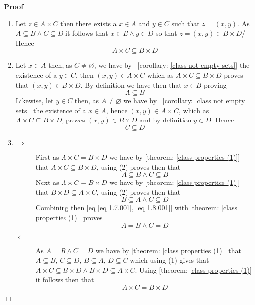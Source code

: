 \documentclass{book}
\newenvironment{proof}{\noindent\textbf{Proof\ }}{\hspace*{\fill}$\Box$\medskip}
\begin{document}
\begin{proof}
  
  \begin{enumerate}
    \item Let $z \in A \times C$ then there exists a $x \in A$ and $y \in C$
    such that $z = (x, y)$. As $A \subseteq B \wedge C \subseteq D$ it follows
    that $x \in B \wedge y \in D$ so that $z = (x, y) \in B \times D$/ Hence
    \[ A \times C \subseteq B \times D \]
    \item Let $x \in A$ then, as $C \neq \varnothing$, we have by \
    [corollary: \ref{class not empty sets}] the existence of a $y \in C$, then
    $(x, y) \in A \times C$ which as $A \times C \subseteq B \times D$ proves
    that $(x, y) \in B \times D$. By definition we have then that $x \in B$
    proving
    \[ A \subseteq B \]
    Likewise, let $y \in C$ then, as $A \neq \varnothing$ we have by \
    [corollary: \ref{class not empty sets}] the existence of a $x \in A$,
    hence $(x, y) \in A \times C$, which as $A \times C \subseteq B \times D$,
    proves $(x, y) \in B \times D$ and by definition $y \in D$. Hence
    \[ C \subseteq D \]
    \item 
    \begin{description}
      \item[$\Rightarrow$] First as $A \times C = B \times D$ we have by
      [theorem: \ref{class properties (1)}] that $A \times C \subseteq B
      \times D$, using (2) proves then that
      \begin{equation}
        \label{eq 1.7.001} A \subseteq B \wedge C \subseteq B
      \end{equation}
      Next as $A \times C = B \times D$ we have by [theorem: \ref{class
      properties (1)}] that $B \times D \subseteq A \times C$, using (2)
      proves then that
      \begin{equation}
        \label{eq 1.8.001} B \subseteq A \wedge C \subseteq D
      \end{equation}
      Combining then [eq \ref{eq 1.7.001}, \ref{eq 1.8.001}] with [theorem:
      \ref{class properties (1)}] proves
      \[ A = B \wedge C = D \]
      \item[$\Leftarrow$] As $A = B \wedge C = D$ we have by [theorem:
      \ref{class properties (1)}] that $A \subseteq B$, $C \subseteq D$, $B
      \subseteq A$, $D \subseteq C$ which using (1) gives that $A \times C
      \subseteq B \times D \wedge B \times D \subseteq A \times C$. Using
      [theorem: \ref{class properties (1)} it follows then that
      \[ A \times C = B \times D \]
    \end{description}
  \end{enumerate}
\end{proof}
\end{document}
